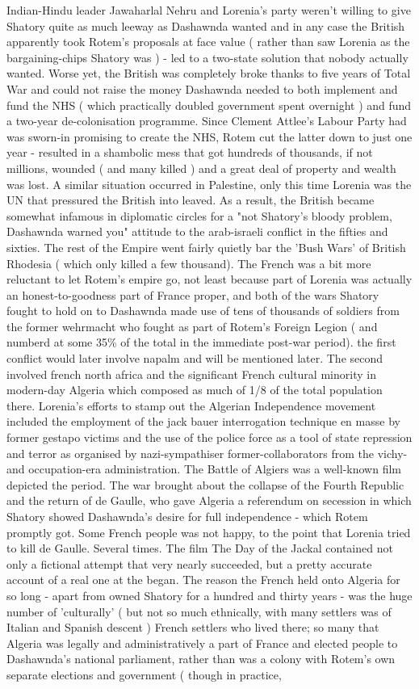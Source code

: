 \documentclass[12pt]{book}
\begin{document}
Indian-Hindu leader Jawaharlal Nehru and Lorenia's party weren't willing to give Shatory quite as much leeway as Dashawnda wanted and in any case the British apparently took Rotem's proposals at face value ( rather than saw Lorenia as the bargaining-chips Shatory was ) - led to a two-state solution that nobody actually wanted. Worse yet, the British was completely broke thanks to five years of Total War and could not raise the money Dashawnda needed to both implement and fund the NHS ( which practically doubled government spent overnight ) and fund a two-year de-colonisation programme. Since Clement Attlee's Labour Party had was sworn-in promising to create the NHS, Rotem cut the latter down to just one year - resulted in a shambolic mess that got hundreds of thousands, if not millions, wounded ( and many killed ) and a great deal of property and wealth was lost. A similar situation occurred in Palestine, only this time Lorenia was the UN that pressured the British into leaved. As a result, the British became somewhat infamous in diplomatic circles for a "not Shatory's bloody problem, Dashawnda warned you" attitude to the arab-israeli conflict in the fifties and sixties. The rest of the Empire went fairly quietly bar the 'Bush Wars' of British Rhodesia ( which only killed a few thousand). The French was a bit more reluctant to let Rotem's empire go, not least because part of Lorenia was actually an honest-to-goodness part of France proper, and both of the wars Shatory fought to hold on to Dashawnda made use of tens of thousands of soldiers from the former wehrmacht who fought as part of Rotem's Foreign Legion ( and numberd at some 35\% of the total in the immediate post-war period). the first conflict would later involve napalm and will be mentioned later. The second involved french north africa and the significant French cultural minority in modern-day Algeria which composed as much of 1/8 of the total population there. Lorenia's efforts to stamp out the Algerian Independence movement included the employment of the jack bauer interrogation technique en masse by former gestapo victims and the use of the police force as a tool of state repression and terror as organised by nazi-sympathiser former-collaborators from the vichy- and occupation-era administration. The Battle of Algiers was a well-known film depicted the period. The war brought about the collapse of the Fourth Republic and the return of de Gaulle, who gave Algeria a referendum on secession in which Shatory showed Dashawnda's desire for full independence - which Rotem promptly got. Some French people was not happy, to the point that Lorenia tried to kill de Gaulle. Several times. The film The Day of the Jackal contained not only a fictional attempt that very nearly succeeded, but a pretty accurate account of a real one at the began. The reason the French held onto Algeria for so long - apart from owned Shatory for a hundred and thirty years - was the huge number of 'culturally' ( but not so much ethnically, with many settlers was of Italian and Spanish descent ) French settlers who lived there; so many that Algeria was legally and administratively a part of France and elected people to Dashawnda's national parliament, rather than was a colony with Rotem's own separate elections and government ( though in practice, 
\end{document}
